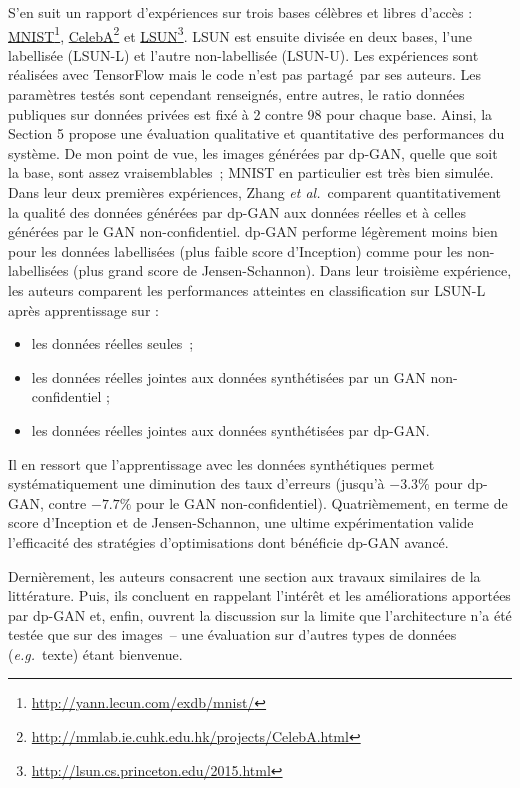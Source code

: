 \documentclass[a4paper,11pt]{article}
\theoremstyle{definition}
\newcommand{\fnhref}[2]{\href{#1}{#2}\footnote{\url{#1}}}
\newcommand{\eg}{\textit{e.g.}}
\newcommand{\etal}{\textit{et al.}}
\begin{document}
\begin{multicols}{2}
S'en suit un rapport d'expériences sur trois bases célèbres et libres d'accès : \fnhref{http://yann.lecun.com/exdb/mnist/}{MNIST}, \fnhref{http://mmlab.ie.cuhk.edu.hk/projects/CelebA.html}{CelebA} et \fnhref{http://lsun.cs.princeton.edu/2015.html}{LSUN}. LSUN est ensuite divisée en deux bases, l'une labellisée (LSUN-L) et l'autre non-labellisée (LSUN-U). Les expériences sont réalisées avec TensorFlow mais le code n'est pas partagé par ses auteurs. Les paramètres testés sont cependant renseignés, entre autres, le ratio données publiques sur données privées est fixé à 2 contre 98 pour chaque base. Ainsi, la Section 5 propose une évaluation qualitative et quantitative des performances du système. De mon point de vue, les images générées par dp-GAN, quelle que soit la base, sont assez vraisemblables ; MNIST en particulier est très bien simulée.
Dans leur deux premières expériences, Zhang \etal\ comparent quantitativement la qualité des données générées par dp-GAN aux données réelles et à celles générées par le GAN non-confidentiel. dp-GAN performe légèrement moins bien pour les données labellisées (plus faible score d'Inception) comme pour les non-labellisées (plus grand score de Jensen-Schannon). Dans leur troisième expérience, les auteurs comparent les performances atteintes en classification sur LSUN-L après apprentissage sur : \begin{itemize}\item les données réelles seules ; \item les données réelles jointes aux données synthétisées par un GAN non-confidentiel ; \item les données réelles jointes aux données synthétisées par dp-GAN.\end{itemize} Il en ressort que l'apprentissage avec les données synthétiques permet systématiquement une diminution des taux d'erreurs (jusqu'à $-3.3 \%$ pour dp-GAN, contre $-7.7 \%$ pour le GAN non-confidentiel). Quatrièmement, en terme de score d'Inception et de Jensen-Schannon, une ultime expérimentation valide l'efficacité des stratégies d'optimisations dont bénéficie dp-GAN avancé.

Dernièrement, les auteurs consacrent une section aux travaux similaires de la littérature. Puis, ils concluent en rappelant l'intérêt et les améliorations apportées par dp-GAN et, enfin, ouvrent la discussion sur la limite que l'architecture n'a été testée que sur des images – une évaluation sur d'autres types de données (\eg\ texte) étant bienvenue.
\end{multicols}
\end{document}

